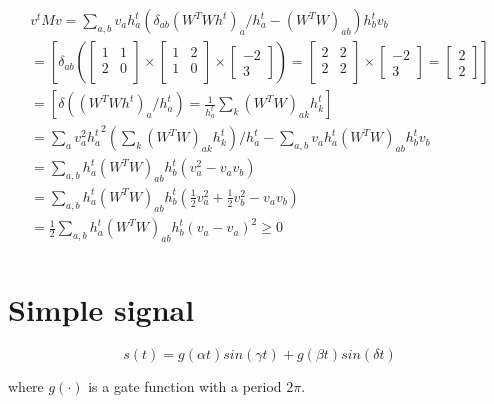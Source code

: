 \documentclass[oneside, final, 14pt]{extarticle}
\begin{document}
\begin{multline*}
  v^t M v =
  \sum_{a,b}v_a h_a^t (\delta_{ab}(W^TWh^t)_a / h_a^t
  -(W^TW)_{ab})h_b^t v_b \\
  =
  \left[
    \delta_{ab}
    \left(
      \begin{bmatrix}1 & 1 \\ 2 & 0 \\ \end{bmatrix} \times
      \begin{bmatrix}1 & 2 \\ 1 & 0 \\ \end{bmatrix} \times
      \begin{bmatrix} -2 \\ 3 \end{bmatrix}
    \right) =
      \begin{bmatrix}2 & 2 \\ 2 & 2 \\ \end{bmatrix} \times
      \begin{bmatrix} -2 \\ 3 \end{bmatrix} =
      \begin{bmatrix} 2 \\ 2 \end{bmatrix}
  \right] \\
  =
  \left[
    \delta((W^TWh^t)_a / h_a^t) =
    \frac{1}{h_a^t} \sum_k (W^TW)_{ak} h_k^t
  \right] \\
  =
  \sum_a v_a^2 {h_a^t}^2 (\sum_k(W^TW)_{ak}h_k^t)/h_a^t -
    \sum_{a,b} v_ah_a^t(W^TW)_{ab}h_b^tv_b \\
  = \sum_{a,b}h_a^t(W^TW)_{ab}h_b^t(v_a^2 - v_av_b) \\
  = \sum_{a,b}h_a^t(W^TW)_{ab}h_b^t(
    \frac{1}{2}v_a^2 + \frac{1}{2}v_b^2 - v_av_b) \\
  = \frac{1}{2} \sum_{a,b}h_a^t(W^TW)_{ab}h_b^t(v_a - v_a)^2 \geqslant 0 \\
\end{multline*}

\section{Simple signal}

\[
  s(t) = g(\alpha t) sin(\gamma t) + g(\beta t) sin(\delta t)
\]

where $g(\cdot)$ is a gate function with a period $2\pi$.
\end{document}
